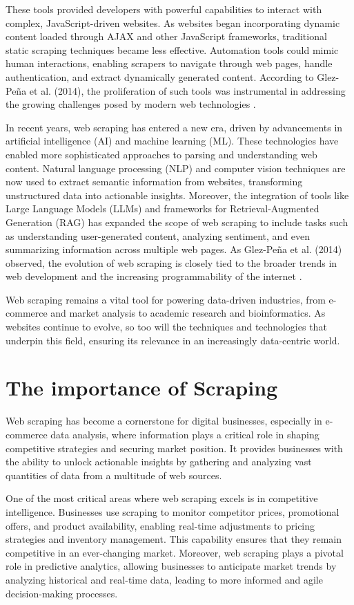 These tools provided developers with powerful capabilities to interact with complex, JavaScript-driven websites. As websites began incorporating dynamic content loaded through AJAX and other JavaScript frameworks, traditional static scraping techniques became less effective. Automation tools could mimic human interactions, enabling scrapers to navigate through web pages, handle authentication, and extract dynamically generated content. According to Glez-Peña et al. (2014), the proliferation of such tools was instrumental in addressing the growing challenges posed by modern web technologies \cite{1}.

In recent years, web scraping has entered a new era, driven by advancements in artificial intelligence (AI) and machine learning (ML). These technologies have enabled more sophisticated approaches to parsing and understanding web content. Natural language processing (NLP) and computer vision techniques are now used to extract semantic information from websites, transforming unstructured data into actionable insights. Moreover, the integration of tools like Large Language Models (LLMs) and frameworks for Retrieval-Augmented Generation (RAG) has expanded the scope of web scraping to include tasks such as understanding user-generated content, analyzing sentiment, and even summarizing information across multiple web pages. As Glez-Peña et al. (2014) observed, the evolution of web scraping is closely tied to the broader trends in web development and the increasing programmability of the internet \cite{1}.

Web scraping remains a vital tool for powering data-driven industries, from e-commerce and market analysis to academic research and bioinformatics. As websites continue to evolve, so too will the techniques and technologies that underpin this field, ensuring its relevance in an increasingly data-centric world.

\section{The importance of  Scraping}
Web scraping has become a cornerstone for digital businesses, especially in e-commerce data analysis, where information plays a critical role in shaping competitive strategies and securing market position. It provides businesses with the ability to unlock actionable insights by gathering and analyzing vast quantities of data from a multitude of web sources. 

One of the most critical areas where web scraping excels is in competitive intelligence. Businesses use scraping to monitor competitor prices, promotional offers, and product availability, enabling real-time adjustments to pricing strategies and inventory management. This capability ensures that they remain competitive in an ever-changing market. Moreover, web scraping plays a pivotal role in predictive analytics, allowing businesses to anticipate market trends by analyzing historical and real-time data, leading to more informed and agile decision-making processes.

